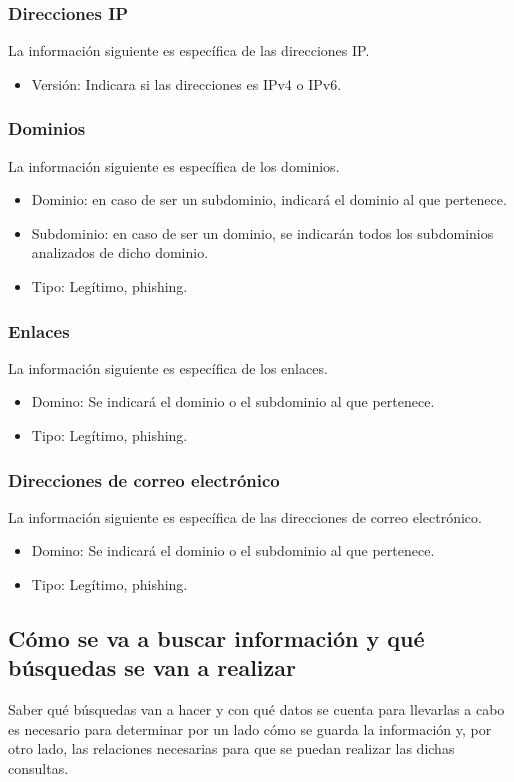 \subsubsection{Direcciones IP}
La información siguiente es específica de las direcciones IP.
\begin{itemize}
    \item Versión: Indicara si las direcciones es IPv4 o IPv6.
\end{itemize}

\subsubsection{Dominios}
La información siguiente es específica de los dominios.
\begin{itemize}
    \item Dominio: en caso de ser un subdominio, indicará el dominio al que pertenece. 
    \item Subdominio: en caso de ser un dominio, se    indicarán todos los subdominios analizados de dicho dominio.
    \item Tipo: Legítimo, phishing. 
\end{itemize}

\subsubsection{Enlaces}
La información siguiente es específica de los enlaces.
\begin{itemize}
    \item Domino: Se indicará el dominio o el subdominio al que pertenece.
    \item Tipo: Legítimo, phishing. 
\end{itemize}

\subsubsection{Direcciones de correo electrónico}
La información siguiente es específica de las direcciones de correo electrónico.
\begin{itemize}
    \item Domino: Se indicará el dominio o el subdominio al que pertenece.
    \item Tipo: Legítimo, phishing. 
\end{itemize}


\subsection{Cómo se va a buscar información y qué búsquedas se van a realizar}
Saber qué búsquedas van a hacer y con qué datos se cuenta para llevarlas a cabo es necesario para determinar por un lado cómo se guarda la información y, por otro lado, las relaciones necesarias para que se puedan realizar las dichas consultas.

